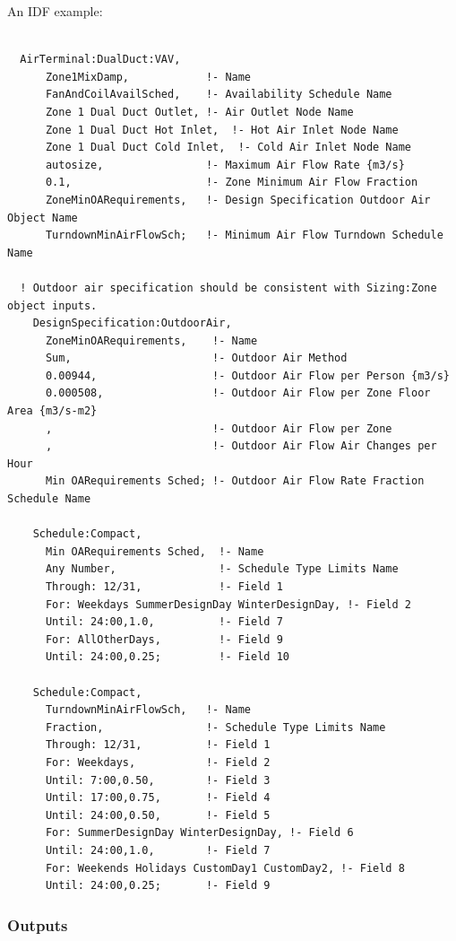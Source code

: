 An IDF example:

\begin{lstlisting}

  AirTerminal:DualDuct:VAV,
      Zone1MixDamp,            !- Name
      FanAndCoilAvailSched,    !- Availability Schedule Name
      Zone 1 Dual Duct Outlet, !- Air Outlet Node Name
      Zone 1 Dual Duct Hot Inlet,  !- Hot Air Inlet Node Name
      Zone 1 Dual Duct Cold Inlet,  !- Cold Air Inlet Node Name
      autosize,                !- Maximum Air Flow Rate {m3/s}
      0.1,                     !- Zone Minimum Air Flow Fraction
      ZoneMinOARequirements,   !- Design Specification Outdoor Air Object Name
      TurndownMinAirFlowSch;   !- Minimum Air Flow Turndown Schedule Name

  ! Outdoor air specification should be consistent with Sizing:Zone object inputs.
    DesignSpecification:OutdoorAir,
      ZoneMinOARequirements,    !- Name
      Sum,                      !- Outdoor Air Method
      0.00944,                  !- Outdoor Air Flow per Person {m3/s}
      0.000508,                 !- Outdoor Air Flow per Zone Floor Area {m3/s-m2}
      ,                         !- Outdoor Air Flow per Zone
      ,                         !- Outdoor Air Flow Air Changes per Hour
      Min OARequirements Sched; !- Outdoor Air Flow Rate Fraction Schedule Name

    Schedule:Compact,
      Min OARequirements Sched,  !- Name
      Any Number,                !- Schedule Type Limits Name
      Through: 12/31,            !- Field 1
      For: Weekdays SummerDesignDay WinterDesignDay, !- Field 2
      Until: 24:00,1.0,          !- Field 7
      For: AllOtherDays,         !- Field 9
      Until: 24:00,0.25;         !- Field 10

    Schedule:Compact,
      TurndownMinAirFlowSch,   !- Name
      Fraction,                !- Schedule Type Limits Name
      Through: 12/31,          !- Field 1
      For: Weekdays,           !- Field 2
      Until: 7:00,0.50,        !- Field 3
      Until: 17:00,0.75,       !- Field 4
      Until: 24:00,0.50,       !- Field 5
      For: SummerDesignDay WinterDesignDay, !- Field 6
      Until: 24:00,1.0,        !- Field 7
      For: Weekends Holidays CustomDay1 CustomDay2, !- Field 8
      Until: 24:00,0.25;       !- Field 9
\end{lstlisting}

\subsubsection{Outputs}\label{outputs-13}

